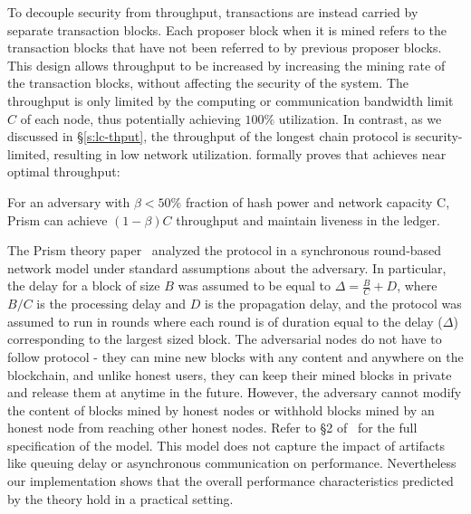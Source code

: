 To decouple security from throughput, transactions are instead carried by separate transaction blocks. Each proposer block when it is mined refers to the transaction blocks that have not been referred to by previous proposer blocks. This design allows throughput to be increased by increasing the mining rate of the transaction blocks, without affecting the security of the system. The throughput is only limited by the computing or communication bandwidth limit $C$ of each node, thus potentially achieving $100\%$ utilization. In contrast, as we discussed in \S\ref{s:lc-thput}, the throughput of the longest chain protocol is security-limited, resulting in low network utilization. \cite{prism-theory} formally proves that \prism achieves near optimal throughput:

\begin{theorem}
\label{thm:throughput} For an adversary with $\beta < 50\%$ fraction of hash power and network capacity C, Prism can achieve  $(1-\beta)C$ throughput and maintain liveness in the ledger.
\end{theorem}


\smallskip
{} The Prism theory paper~\cite{prism-theory} analyzed the protocol in a synchronous round-based network model under standard assumptions about the adversary. In particular, the delay for a block of size $B$ was assumed to be equal to $\Delta = \frac{B}{C}+D$, where $B/C$ is the processing delay and $D$ is the propagation delay, and the protocol was assumed to run in rounds where each round is of duration equal to the delay ($\Delta$) corresponding to the largest sized block. The adversarial nodes do not have to follow protocol - they can mine new blocks with any content and anywhere on the blockchain, and  unlike honest users, they can keep their mined blocks in private and release them at anytime in the future. However, the adversary cannot modify the content of blocks mined by honest nodes or withhold blocks mined by an honest node from reaching other honest nodes. Refer to \S2 of~\cite{prism-theory} for the full specification of the model. This model does not capture the impact of artifacts like queuing delay or asynchronous communication on performance. Nevertheless our implementation shows that the overall performance characteristics predicted by the theory hold in a practical setting. 


